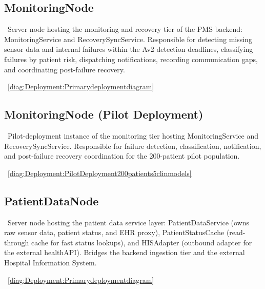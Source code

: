 \subsection{MonitoringNode}\label{node:DeploymentMonitoringNode}
	\begin{description}
		\item[Responsibility:]~Server node hosting the monitoring and recovery tier of the PMS backend: MonitoringService and RecoverySyncService. Responsible for detecting missing sensor data and internal failures within the Av2 detection deadlines, classifying failures by patient risk, dispatching notifications, recording communication gaps, and coordinating post-failure recovery.
		\item[Visible on diagrams:]~\cref{diag:Deployment:Primarydeploymentdiagram}		
	\end{description}

\subsection{MonitoringNode (Pilot Deployment)}\label{node:DeploymentMonitoringNodePilotDeployment}
	\begin{description}
		\item[Responsibility:]~Pilot-deployment instance of the monitoring tier hosting MonitoringService and RecoverySyncService. Responsible for failure detection, classification, notification, and post-failure recovery coordination for the 200-patient pilot population.
		\item[Visible on diagrams:]~\cref{diag:Deployment:PilotDeployment200patients5clinmodels}		
	\end{description}

\subsection{PatientDataNode}\label{node:DeploymentPatientDataNode}
	\begin{description}
		\item[Responsibility:]~Server node hosting the patient data service layer: PatientDataService (owns raw sensor data, patient status, and  EHR proxy), PatientStatusCache (read-through cache for fast status lookups), and HISAdapter (outbound adapter for the external  healthAPI). Bridges the backend ingestion tier and the external Hospital Information System.
		\item[Visible on diagrams:]~\cref{diag:Deployment:Primarydeploymentdiagram}		
	\end{description}

